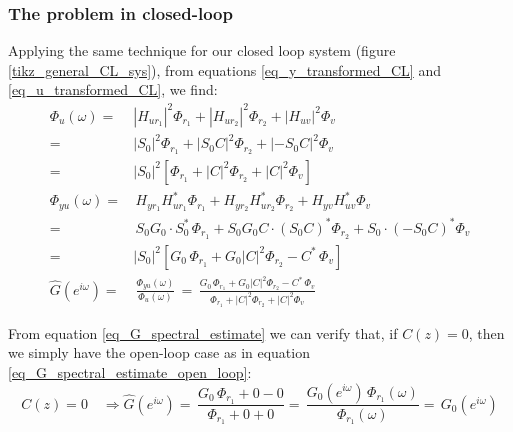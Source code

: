 \documentclass[  10pt, twoside]{report} %
\numberwithin{equation}{chapter}
\begin{document}
\subsubsection{The problem in closed-loop}
Applying the same technique for our closed loop system (figure \ref{tikz_general_CL_sys}), from equations \eqref{eq_y_transformed_CL} and \eqref{eq_u_transformed_CL}, we find:
\begin{align}
\Phi_{u}(\omega) =& \left|H_{ur_{1}}\right|^2 \Phi_{r_{1}} + \left|H_{ur_{2}}\right|^2 \Phi_{r_{2}} + \left|H_{uv}\right|^2 \Phi_{v} \nonumber\\ 
                 =& \left|S_{0}\right|^2 \Phi_{r_{1}} + \left|S_{0} C\right|^2 \Phi_{r_{2}} + \left|- S_{0} C\right|^2 \Phi_{v} \nonumber \\
                 =& \left|S_{0}\right|^2 \left[\Phi_{r_{1}} + \left| C\right|^2 \Phi_{r_{2}} + \left|C\right|^2 \Phi_{v} \right] \\[2mm]
\Phi_{yu}(\omega) =& \, H_{yr_{1}} H^{*}_{ur_{1}} \Phi_{r_{1}} + H_{yr_{2}} H^{*}_{ur_{2}} \Phi_{r_{2}} + H_{yv}{} H^{*}_{uv} \Phi_{v} \nonumber \\ 
                  =& \, S_0 G_0 \cdot S^{*}_{0} \, \Phi_{r_{1}} + S_0 G_0 C \cdot \left(S_0 C\right)^{*} \Phi_{r_{2}} + S_0 \cdot \left(-S_0 C\right)^{*} \Phi_{v} \nonumber \\ 
                  =&\left|S_{0}\right|^2  \left[ G_0 \,  \Phi_{r_{1}} +  G_0 \left|C\right|^2 \Phi_{r_{2}} - C^{*} \, \Phi_{v} \right] \\[2mm]
\widehat{G}(e^{i\omega}) =& \, \frac{\Phi_{yu}(\omega)}{\Phi_{u}(\omega)} \, =\, \frac{G_0 \,  \Phi_{r_{1}} +  G_0 \left|C\right|^2 \Phi_{r_{2}} - C^{*} \, \Phi_{v} }{ \Phi_{r_{1}} + \left| C\right|^2 \Phi_{r_{2}} + \left|C\right|^2 \Phi_{v} } \label{eq_G_spectral_estimate}
\end{align}

From equation \eqref{eq_G_spectral_estimate} we can verify that, if $C(z)=0$, then we simply have the open-loop case as in equation \eqref{eq_G_spectral_estimate_open_loop}:
\begin{equation}
    C(z)=0  \quad \Longrightarrow \widehat{G}(e^{i\omega}) =\, \frac{G_0 \,  \Phi_{r_{1}} +  0 - 0 }{ \Phi_{r_{1}} + 0 + 0} =\, \frac{G_{0}(e^{i\omega}) \,  \Phi_{r_{1}}(\omega) }{ \Phi_{r_{1}}(\omega) } = \, G_{0}(e^{i\omega})   
\end{equation}
\end{document}

